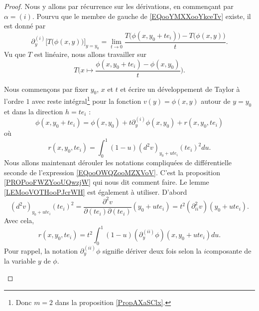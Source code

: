 \begin{proof}
	Nous y allons par récurrence sur les dérivations, en commençant par \( \alpha=(i)\). Pourvu que le membre de gauche de \eqref{EQooYMXXooYkceTv} existe, il est donné par
	\begin{equation}        \label{EQooBHSSooXDrYQh}
		\partial_y^{(i)}\big[ T\big( \phi(x,y) \big) \big]_{y=y_0}=\lim_{t\to 0} \frac{ T\big( \phi(x,y_0+te_i) \big)-T\big( \phi(x,y) \big) }{ t }.
	\end{equation}
	Vu que \( T\) est linéaire, nous allons travailler sur
	\begin{equation}        \label{EQooXEFAooNzLBZx}
		T\Big(x\mapsto \frac{ \phi(x,y_0+te_i)-\phi(x,y_0)}{t} \Big).
	\end{equation}
	\begin{subproof}
		\spitem[Un développement]
		Nous commençons par fixer \( y_0\), \( x\) et \( t\) et écrire un développement de Taylor à l'ordre \( 1\) avec reste intégral\footnote{Donc \( m=2\) dans la proposition \ref{PropAXaSClx}.} pour la fonction \( v(y)=\phi(x,y)\) autour de \( y=y_0\) et dans la direction \( h=te_i\) :
		\begin{equation}        \label{EQooBMYMooAjrTGH}
			\phi(x,y_0+te_i)=\phi(x,y_0)+t\partial_y^{(i)}\phi(x,y_0)+r(x,y_0,te_i)
		\end{equation}
		où
		\begin{equation}        \label{EQooOWQZooMZXVoV}
			r(x,y_0,te_i)=\int_0^1(1-u)(d^2v)_{y_0+ute_i}(te_i)^2du.
		\end{equation}
		Nous allons maintenant dérouler les notations compliquées de différentielle seconde de l'expression \eqref{EQooOWQZooMZXVoV}. C'est la proposition \ref{PROPooFWZYooUQwzjW} qui nous dit comment faire. Le lemme \ref{LEMooVOTHooPJcrWH} est également à utiliser. D'abord
		\begin{equation}
			(d^2v)_{y_0+ute_i}(te_i)^2=\frac{ \partial^2v }{ \partial(te_i)\partial(te_i) }(y_0+ute_i)=t^2(\partial^2_{ii}v)(y_0+ute_i).
		\end{equation}
		Avec cela,
		\begin{equation}        \label{EQooLIBWooYJshbY}
			r(x,y_0,te_i)=t^2\int_0^1(1-u)(\partial_y^{(ii)}\phi)(x,y_0+ute_i)du.
		\end{equation}
		Pour rappel, la notation \( \partial_y^{(ii)}\phi\) signifie dériver deux fois selon la \( i\)\ieme composante de la variable \( y\) de \( \phi\).


\end{subproof}
\end{proof}

